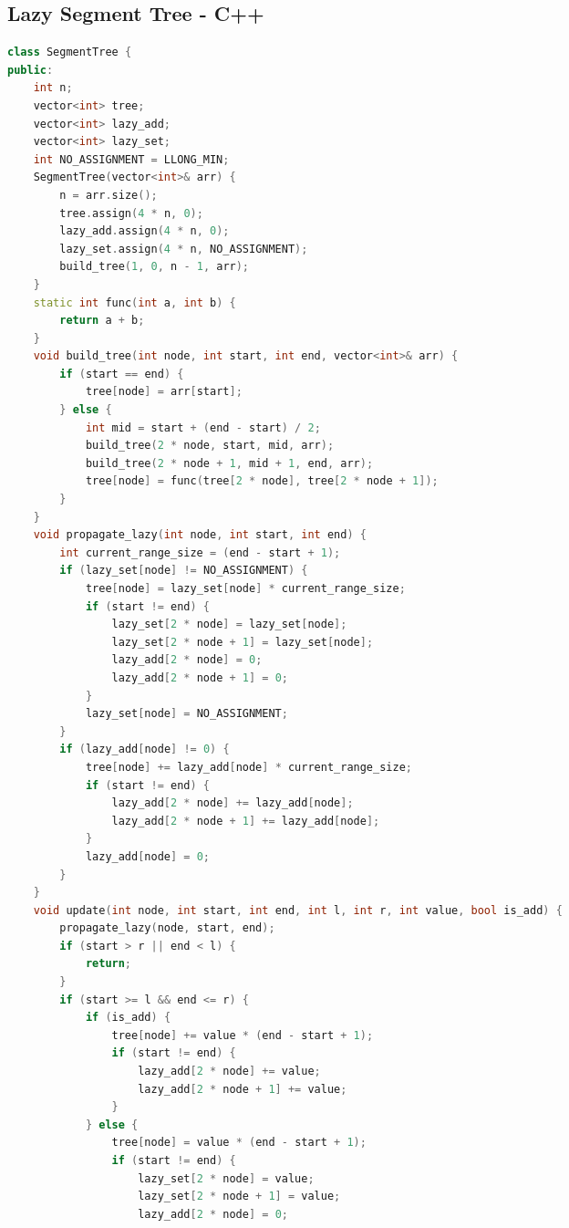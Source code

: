 \documentclass[10pt,landscape, a4paper]{article}
\begin{document}
\begin{multicols*}{3}
\section{Lazy Segment Tree - C++}
\begin{lstlisting}[language=C++]
class SegmentTree {
public:
    int n;
    vector<int> tree;
    vector<int> lazy_add;
    vector<int> lazy_set;
    int NO_ASSIGNMENT = LLONG_MIN;
    SegmentTree(vector<int>& arr) {
        n = arr.size();
        tree.assign(4 * n, 0);
        lazy_add.assign(4 * n, 0);
        lazy_set.assign(4 * n, NO_ASSIGNMENT);
        build_tree(1, 0, n - 1, arr);
    }
    static int func(int a, int b) {
        return a + b;
    }
    void build_tree(int node, int start, int end, vector<int>& arr) {
        if (start == end) {
            tree[node] = arr[start];
        } else {
            int mid = start + (end - start) / 2;
            build_tree(2 * node, start, mid, arr);
            build_tree(2 * node + 1, mid + 1, end, arr);
            tree[node] = func(tree[2 * node], tree[2 * node + 1]);
        }
    }
    void propagate_lazy(int node, int start, int end) {
        int current_range_size = (end - start + 1);
        if (lazy_set[node] != NO_ASSIGNMENT) {
            tree[node] = lazy_set[node] * current_range_size;
            if (start != end) {
                lazy_set[2 * node] = lazy_set[node];
                lazy_set[2 * node + 1] = lazy_set[node];
                lazy_add[2 * node] = 0;
                lazy_add[2 * node + 1] = 0;
            }
            lazy_set[node] = NO_ASSIGNMENT;
        }
        if (lazy_add[node] != 0) {
            tree[node] += lazy_add[node] * current_range_size;
            if (start != end) {
                lazy_add[2 * node] += lazy_add[node];
                lazy_add[2 * node + 1] += lazy_add[node];
            }
            lazy_add[node] = 0;
        }
    }
    void update(int node, int start, int end, int l, int r, int value, bool is_add) {
        propagate_lazy(node, start, end);
        if (start > r || end < l) {
            return;
        }
        if (start >= l && end <= r) {
            if (is_add) {
                tree[node] += value * (end - start + 1);
                if (start != end) {
                    lazy_add[2 * node] += value;
                    lazy_add[2 * node + 1] += value;
                }
            } else {
                tree[node] = value * (end - start + 1);
                if (start != end) {
                    lazy_set[2 * node] = value;
                    lazy_set[2 * node + 1] = value;
                    lazy_add[2 * node] = 0;

\end{lstlisting}
\end{multicols*}
\end{document}
